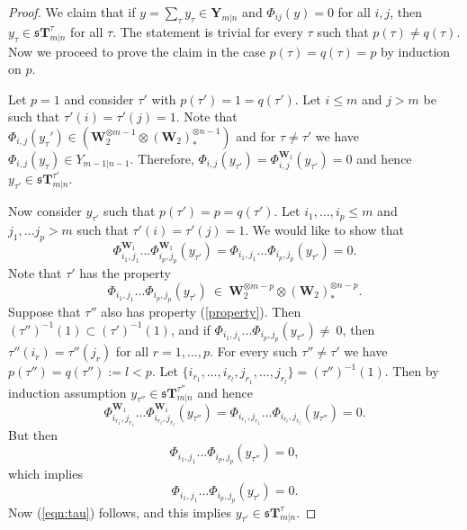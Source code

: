 \documentclass[12pt,oneside,english]{amsart}
\numberwithin{equation}{section}
\numberwithin{figure}{section}
\theoremstyle{plain}
\theoremstyle{plain}
\theoremstyle{remark}
\theoremstyle{definition}
\theoremstyle{plain}
\theoremstyle{remark}
\theoremstyle{definition}
\theoremstyle{plain}
\theoremstyle{plain}
\theoremstyle{definition}
\newcommand{\bT}{\mathbf{T}}
\newcommand{\bY}{\mathbf{Y}}
\newcommand{\bbW}{\mathbf{W}}
\newcommand{\fs}{\mathfrak{s}}
\begin{document}
\begin{proof}
  We claim that if $y=\sum_{\tau}y_{\tau}\in \bY_{m|n}$ and $\Phi_{ij}(y)=0$
  for all $i,j$, then $y_{\tau}\in\fs \bT_{m|n}^{\tau}$ for all $\tau$. The
  statement is trivial for every $\tau$ such that $p(\tau)\neq q(\tau)$. Now we proceed to prove the claim in the case
  $p(\tau)=q(\tau)=p$ by induction on $p$.

Let $p=1$ and consider $\tau'$ with $p(\tau')=1=q(\tau')$. Let $i\leq m$ and $j>m$ be
such that $\tau'(i)=\tau'(j)=1$. Note that $\Phi_{i,j}(y_\tau')\in
(\bbW_2^{\otimes m-1}\otimes(\bbW_2)_*^{\otimes  n-1})$ and for
$\tau\neq\tau'$ we have $\Phi_{i,j}(y_{\tau})\in Y_{m-1|n-1}$. Therefore,
$\Phi_{i,j}(y_{\tau'})=\Phi_{i,j}^{\bbW_1}(y_{\tau'})=0$ and hence
$y_{\tau'}\in \fs \bT^{\tau'}_{m|n}$.

Now consider $y_{\tau'}$ such that $p(\tau')=p=q(\tau')$. Let  $i_1,\dots,i_p\leq m$ and $ j_1,\dots j_p>m$ such that $\tau'(i)=\tau'(j)=1$.
We would like to show that
\begin{equation}\label{eqn:tau} \Phi^{\bbW_1}_{i_1,j_1}\dots \Phi^{\bbW_1}_{i_p,j_p}(y_{\tau'})=\Phi_{i_1,j_1}\dots \Phi_{i_p,j_p}(y_{\tau'})=0.\end{equation}
Note that $\tau'$ has the property
\begin{equation}\label{property}\Phi_{i_1,j_1}\dots \Phi_{i_p,j_p}(y_{\tau'})\ \in\ \bbW_2^{\otimes m-p}\otimes(\bbW_2)_*^{\otimes  n-p}.\end{equation} Suppose that
$\tau''$ also has property (\ref{property}). Then
$(\tau'')^{-1}(1)\subset (\tau')^{-1}(1)$, and
if $\Phi_{i_1,j_1}\dots \Phi_{i_p,j_p}(y_{\tau''})\neq~0$, then
$\tau''(i_r)=\tau''(j_r)$ for all $r=1,\dots,p$. For every such
$\tau''\neq\tau'$ we have $p(\tau'')=q(\tau''):=l<p$. Let $\{i_{r_1},\dots,
i_{r_l},j_{r_1},\dots, j_{r_l}\}=(\tau'')^{-1}(1)$. Then by induction
assumption  $y_{\tau''}\in\fs \bT_{m|n}^{\tau''}$ and hence $$\Phi^{\bbW_1}_{i_{r_1},j_{r_1}}\dots \Phi^{\bbW_1}_{i_{r_l},j_{r_l}}(y_{\tau''})=\Phi_{i_{r_1},j_{r_1}}\dots \Phi_{i_{r_l},j_{r_l}}(y_{\tau''})=0.$$
But then
$$\Phi_{i_1,j_1}\dots \Phi_{i_p,j_p}(y_{\tau''})=0,$$
which implies
$$\Phi_{i_1,j_1}\dots \Phi_{i_p,j_p}(y_{\tau'})=0.$$
Now (\ref{eqn:tau}) follows, and this implies $y_{\tau'}\in\fs \bT_{m|n}^{\tau}$.
\end{proof}
\end{document}
